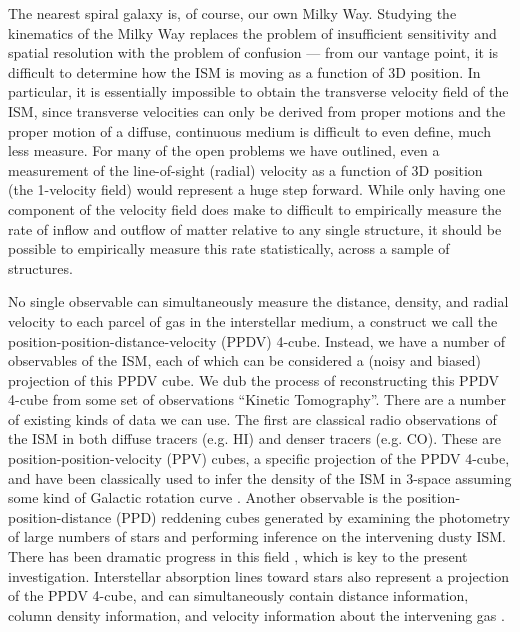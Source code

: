 The nearest spiral galaxy is, of course, our own Milky Way. 
Studying the kinematics of the Milky Way replaces the problem of insufficient sensitivity and spatial resolution with the problem of confusion --- from our vantage point, it is difficult to determine how the ISM is moving as a function of 3D position.
In particular, it is essentially impossible to obtain the transverse velocity field of the ISM, since transverse velocities can only be derived from proper motions and the proper motion of a diffuse, continuous medium is difficult to even define, much less measure. 
For many of the open problems we have outlined, even a measurement of the line-of-sight (radial) velocity as a function of 3D position (the 1-velocity field) would represent a huge step forward. 
While only having one component of the velocity field does make to difficult to empirically measure the  rate of inflow and outflow of matter relative to any single structure, it should be possible to empirically measure this rate statistically, across a sample of structures. 

No single observable can simultaneously measure the distance, density, and radial velocity to each parcel of gas in the interstellar medium, a construct we call the position-position-distance-velocity (PPDV) 4-cube. Instead, we have a number of observables of the ISM, each of which can be considered a (noisy and biased) projection of this PPDV cube. We dub the process of reconstructing this PPDV 4-cube from some set of observations ``Kinetic Tomography''. There are a number of existing kinds of data we can use. The first are classical radio observations of the ISM in both diffuse tracers (e.g. HI) and denser tracers (e.g. CO). These are position-position-velocity (PPV) cubes, a specific projection of the PPDV 4-cube, and have been classically used to infer the density of the ISM in 3-space assuming some kind of Galactic rotation curve \citep[e.g.][ and references therein]{Levine_2006}. Another observable is the position-position-distance (PPD) reddening cubes generated by examining the photometry of large numbers of stars and performing inference on the intervening dusty ISM. There has been dramatic progress in this field \citep{Marshall_2006,Lallement_2014,Green_2015}, which is key to the present investigation. Interstellar absorption lines toward stars also represent a projection of the PPDV 4-cube, and can simultaneously contain distance information, column density information, and velocity information about the intervening gas \citep{Welsh10,Zasowski_2014,2015MmSAI..86..521Z}.

